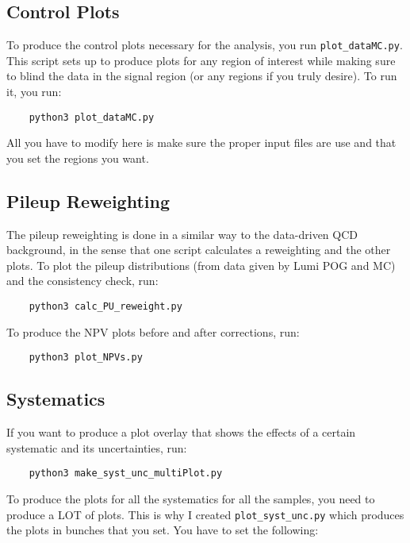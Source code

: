 \subsection{Control Plots}
To produce the control plots necessary for the analysis, you run \verb|plot_dataMC.py|. This script sets up to produce plots for any region of interest while making sure to blind the data in the signal region (or any regions if you truly desire). To run it, you run:

\begin{verbatim}
    python3 plot_dataMC.py
\end{verbatim}

\noindent All you have to modify here is make sure the proper input files are use and that you set the regions you want.

\subsection{Pileup Reweighting}
The pileup reweighting is done in a similar way to the data-driven QCD background, in the sense that one script calculates a reweighting and the other plots. To plot the pileup distributions (from data given by Lumi POG and MC) and the consistency check, run:

\begin{verbatim}
    python3 calc_PU_reweight.py
\end{verbatim}

\noindent To produce the NPV plots before and after corrections, run:

\begin{verbatim}
    python3 plot_NPVs.py
\end{verbatim}

\subsection{Systematics}
If you want to produce a plot overlay that shows the effects of a certain systematic and its uncertainties, run:

\begin{verbatim}
    python3 make_syst_unc_multiPlot.py
\end{verbatim}

\noindent To produce the plots for all the systematics for all the samples, you need to produce a LOT of plots. This is why I created \verb|plot_syst_unc.py| which produces the plots in bunches that you set. You have to set the following:

